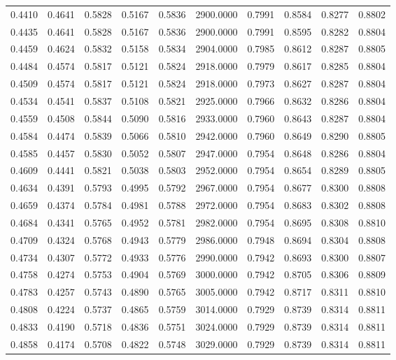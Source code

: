 \begin{tabular}{rrrrrrrrrr}
0.4410 & 0.4641 & 0.5828 & 0.5167 & 0.5836 & 2900.0000 & 0.7991 & 0.8584 & 0.8277 & 0.8802 \\
0.4435 & 0.4641 & 0.5828 & 0.5167 & 0.5836 & 2900.0000 & 0.7991 & 0.8595 & 0.8282 & 0.8804 \\
0.4459 & 0.4624 & 0.5832 & 0.5158 & 0.5834 & 2904.0000 & 0.7985 & 0.8612 & 0.8287 & 0.8805 \\
0.4484 & 0.4574 & 0.5817 & 0.5121 & 0.5824 & 2918.0000 & 0.7979 & 0.8617 & 0.8285 & 0.8804 \\
0.4509 & 0.4574 & 0.5817 & 0.5121 & 0.5824 & 2918.0000 & 0.7973 & 0.8627 & 0.8287 & 0.8804 \\
0.4534 & 0.4541 & 0.5837 & 0.5108 & 0.5821 & 2925.0000 & 0.7966 & 0.8632 & 0.8286 & 0.8804 \\
0.4559 & 0.4508 & 0.5844 & 0.5090 & 0.5816 & 2933.0000 & 0.7960 & 0.8643 & 0.8287 & 0.8804 \\
0.4584 & 0.4474 & 0.5839 & 0.5066 & 0.5810 & 2942.0000 & 0.7960 & 0.8649 & 0.8290 & 0.8805 \\
0.4585 & 0.4457 & 0.5830 & 0.5052 & 0.5807 & 2947.0000 & 0.7954 & 0.8648 & 0.8286 & 0.8804 \\
0.4609 & 0.4441 & 0.5821 & 0.5038 & 0.5803 & 2952.0000 & 0.7954 & 0.8654 & 0.8289 & 0.8805 \\
0.4634 & 0.4391 & 0.5793 & 0.4995 & 0.5792 & 2967.0000 & 0.7954 & 0.8677 & 0.8300 & 0.8808 \\
0.4659 & 0.4374 & 0.5784 & 0.4981 & 0.5788 & 2972.0000 & 0.7954 & 0.8683 & 0.8302 & 0.8808 \\
0.4684 & 0.4341 & 0.5765 & 0.4952 & 0.5781 & 2982.0000 & 0.7954 & 0.8695 & 0.8308 & 0.8810 \\
0.4709 & 0.4324 & 0.5768 & 0.4943 & 0.5779 & 2986.0000 & 0.7948 & 0.8694 & 0.8304 & 0.8808 \\
0.4734 & 0.4307 & 0.5772 & 0.4933 & 0.5776 & 2990.0000 & 0.7942 & 0.8693 & 0.8300 & 0.8807 \\
0.4758 & 0.4274 & 0.5753 & 0.4904 & 0.5769 & 3000.0000 & 0.7942 & 0.8705 & 0.8306 & 0.8809 \\
0.4783 & 0.4257 & 0.5743 & 0.4890 & 0.5765 & 3005.0000 & 0.7942 & 0.8717 & 0.8311 & 0.8810 \\
0.4808 & 0.4224 & 0.5737 & 0.4865 & 0.5759 & 3014.0000 & 0.7929 & 0.8739 & 0.8314 & 0.8811 \\
0.4833 & 0.4190 & 0.5718 & 0.4836 & 0.5751 & 3024.0000 & 0.7929 & 0.8739 & 0.8314 & 0.8811 \\
0.4858 & 0.4174 & 0.5708 & 0.4822 & 0.5748 & 3029.0000 & 0.7929 & 0.8739 & 0.8314 & 0.8811 \\

\end{tabular}
